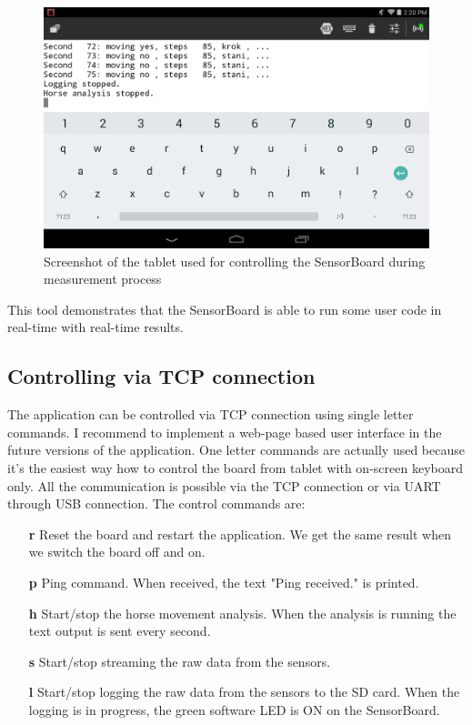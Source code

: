 \begin{figure}
	\centering
	\label{fig:HorseAnalysisTablet}
	\caption{Screenshot of the tablet used for controlling the SensorBoard during measurement process}
	\includegraphics[width=16cm]{img/HorseAnalysisTablet.png}
\end{figure}

This tool demonstrates that the SensorBoard is able to run some user code in real-time with real-time results.

\subsection{Controlling via TCP connection}
The application can be controlled via TCP connection using single letter commands. I recommend to implement a web-page based user interface in the future versions of the application. One letter commands are actually used because it's the easiest way how to control the board from tablet with on-screen keyboard only. All the communication is possible via the TCP connection or via UART through USB connection. The control commands are:

\begin{itemize}
	\item[\textbf{r}] Reset the board and restart the application. We get the same result when we switch the board off and on.
	\item[\textbf{p}] Ping command. When received, the text "Ping received." is printed.
	\item[\textbf{h}] Start/stop the horse movement analysis. When the analysis is running the text output is sent every second.
	\item[\textbf{s}] Start/stop streaming the raw data from the sensors.
	\item[\textbf{l}] Start/stop logging the raw data from the sensors to the SD card. When the logging is in progress, the green software LED is ON on the SensorBoard.
\end{itemize}

